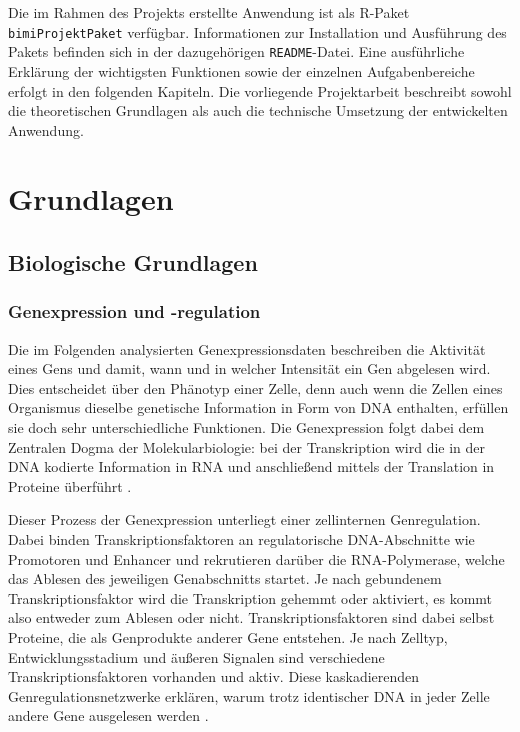 \documentclass[12pt]{article}
\begin{document}
Die im Rahmen des Projekts erstellte Anwendung ist als R-Paket \verb*|bimiProjektPaket| verfügbar. Informationen zur Installation und Ausführung des Pakets befinden sich in der dazugehörigen \verb*|README|-Datei. Eine ausführliche Erklärung der wichtigsten Funktionen sowie der einzelnen Aufgabenbereiche erfolgt in den folgenden Kapiteln.
 Die vorliegende Projektarbeit beschreibt sowohl die theoretischen Grundlagen als auch die technische Umsetzung der entwickelten Anwendung.

\newpage
\pagestyle{fancy}
\fancyhead{}
\section{Grundlagen}
\label{grundlagen}

\subsection{Biologische Grundlagen}
\label{bio-grundlagen}

\subsubsection{Genexpression und -regulation}

Die im Folgenden analysierten Genexpressionsdaten beschreiben die Aktivität eines Gens und damit, wann und in welcher Intensität ein Gen abgelesen wird. Dies entscheidet über den Phänotyp einer Zelle, denn auch wenn die Zellen eines Organismus dieselbe genetische Information in Form von DNA enthalten, erfüllen sie doch sehr unterschiedliche Funktionen. Die Genexpression folgt dabei dem Zentralen Dogma der Molekularbiologie: bei der Transkription wird die in der DNA kodierte Information in RNA und anschließend mittels der Translation in Proteine überführt \cite{LeeYoung2013}.

Dieser Prozess der Genexpression unterliegt einer zellinternen Genregulation. Dabei binden Transkriptionsfaktoren an regulatorische DNA-Abschnitte wie Promotoren und Enhancer und rekrutieren darüber die RNA-Polymerase, welche das Ablesen des jeweiligen Genabschnitts startet. Je nach gebundenem Transkriptionsfaktor wird die Transkription gehemmt oder aktiviert, es kommt also entweder zum Ablesen oder nicht. Transkriptionsfaktoren sind dabei selbst Proteine, die als Genprodukte anderer Gene entstehen. Je nach Zelltyp, Entwicklungsstadium und äußeren Signalen sind verschiedene Transkriptionsfaktoren vorhanden und aktiv. Diese kaskadierenden Genregulationsnetzwerke erklären, warum trotz identischer DNA in jeder Zelle andere Gene ausgelesen werden \cite{LeeYoung2013}.
\end{document}
